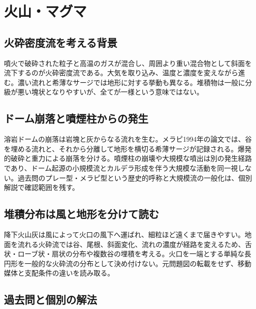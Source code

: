 \chapter{火山・マグマ}
\section{火砕密度流を考える背景}
\label{theory:volcanology:pyroflow}
噴火で破砕された粒子と高温のガスが混合し、周囲より重い混合物として斜面を流下するのが火砕密度流である。大気を取り込み、温度と濃度を変えながら進む。濃い流れと希薄なサージでは地形に対する挙動も異なる。堆積物は一般に分級が悪い塊状となりやすいが、全てが一様という意味ではない。

\section{ドーム崩落と噴煙柱からの発生}
\label{theory:volcanology:source}
溶岩ドームの崩落は岩塊と灰からなる流れを生む。メラピ1994年の論文では、谷を埋める流れと、それから分離して地形を横切る希薄サージが記録される。爆発的破砕と重力による崩落を分ける。噴煙柱の崩壊や大規模な噴出は別の発生経路であり、ドーム起源の小規模流とカルデラ形成を伴う大規模な活動を同一視しない。過去問のプレー型・メラピ型という歴史的呼称と大規模流の一般化は、個別解説で確認範囲を残す。\cite{volc_usgs_merapi}

\section{堆積分布は風と地形を分けて読む}
\label{theory:volcanology:distribution}
降下火山灰は風によって火口の風下へ運ばれ、細粒ほど遠くまで届きやすい。地面を流れる火砕流では谷、尾根、斜面変化、流れの濃度が経路を変えるため、舌状・ローブ状・扇状の分布や複数谷の埋積を考える。火口を一端とする単純な長円形を一般的な火砕流の分布として決め付けない。元問題図の転載をせず、移動媒体と支配条件の違いを読み取る。\cite{volc_usgs_msh_flow,volc_usgs_merapi}



\section{過去問と個別の解法}

